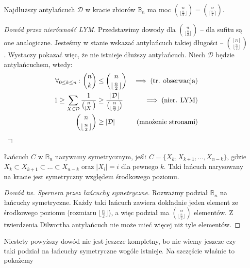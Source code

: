 \begin{theorem}
	Najdłuższy antyłańcuch \(\mathcal D\) w kracie zbiorów \(\mathbb B_n\) ma moc \(\binom{n}{\lfloor\frac{n}{2}\rfloor} = \binom{n}{\lceil\frac{n}{2}\rceil}\).
\end{theorem}

\begin{proof}[Dowód przez nierówność LYM]
	Przedstawimy dowody dla \(\binom{n}{\lfloor\frac n2\rfloor}\) -- dla sufitu są one analogiczne.
	Jesteśmy w stanie wskazać antyłańcuch takiej długości -- \(\binom{[n]}{\lfloor\frac{n}{2}\rfloor}\).
	Wystaczy pokazać więc, że nie istnieje dłuższy antyłańcuch.
	Niech \(\mathcal{D}\) będzie antyłańcuchem, wtedy:
	\begin{align*}
		\forall_{0 \leq k \leq n}: \binom{n}{k}                       & \leq \binom{n}{\lfloor\frac{n}{2}\rfloor}                            & \implies \text{(tr. obserwacja)} \\
		1 \geq \sum_{X \in \mathcal{D}} \frac{1}{\binom{n}{\card{X}}} & \geq \frac{\card{\mathcal{D}}}{\binom{n}{\lfloor\frac{n}{2}\rfloor}} & \implies \text{(nier. LYM)}      \\
		\binom{n}{\lfloor\frac{n}{2}\rfloor}                          & \geq \card{\mathcal{D}}                                              & \text{(mnożenie stronami)}
	\end{align*}
\end{proof}

\begin{definition}
	Łańcuch \(C\) w \(\mathbb{B}_n\) nazywamy symetrycznym, jeśli \(C=\{X_k, X_{k+1},
	\ldots, X_{n-k}\}\), gdzie \(X_k \subset X_{k+1} \subset \ldots \subset
	X_{n-k}\) oraz \(|X_i|=i\) dla pewnego \(k\). Taki łańcuch narysowany na kracie
	jest symetryczny względem środkowego poziomu.
\end{definition}

\begin{proof}[Dowód tw. Spernera przez łańcuchy symetryczne]
	Rozważmy podział \(\mathbb B_n\) na łańcuchy symetryczne. Każdy taki łańcuch
	zawiera dokładnie jeden element ze środkowego poziomu (rozmiaru  \(\lfloor \frac
	n2 \rfloor\)), a więc podział ma \(\binom{n}{\lfloor \frac n2 \rfloor}\)
	elementów. Z twierdzenia Dilwortha antyłańcuch nie może mieć więcej niż tyle
	elementów.
\end{proof}
Niestety powyższy dowód nie jest jeszcze kompletny, bo nie wiemy jeszcze czy taki
podział na łańcuchy symetryczne wogóle istnieje. Na szczęście właśnie to pokażemy

